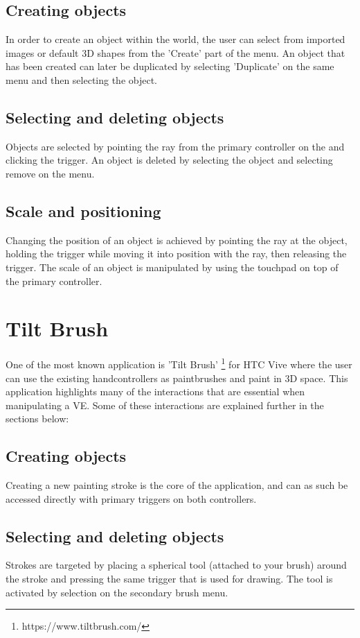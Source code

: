 \subsection{Creating objects}
In order to create an object within the world, the user can select from imported images or default 3D shapes from the 'Create' part of the menu. An object that has been created can later be duplicated by selecting 'Duplicate' on the same menu and then selecting the object.
\subsection{Selecting and deleting objects}
Objects are selected by pointing the ray from the primary controller on the and clicking the trigger. An object is deleted by selecting the object and selecting remove on the menu.
\subsection{Scale and positioning}
Changing the position of an object is achieved by pointing the ray at the object, holding the trigger while moving it into position with the ray, then releasing the trigger. The scale of an object is manipulated by using the touchpad on top of the primary controller.

\section{Tilt Brush}
\label{relatedwork:tiltbrush}
 One of the most known application is 'Tilt Brush' \footnote{https://www.tiltbrush.com/} for HTC Vive where the user can use the existing handcontrollers as paintbrushes and paint in 3D space. This application highlights many of the interactions that are essential when manipulating a VE. Some of these interactions are explained further in the sections below:
\subsection{Creating objects}
Creating a new painting stroke is the core of the application, and can as such be accessed directly with primary triggers on both controllers.
\subsection{Selecting and deleting objects}
Strokes are targeted by placing a spherical tool (attached to your brush) around the stroke and pressing the same trigger that is used for drawing. The tool is activated by selection on the secondary brush menu.

